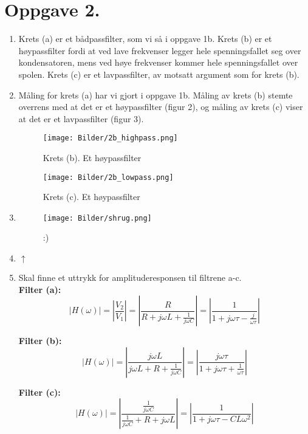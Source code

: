 \documentclass[a4paper,11pt,norsk]{article}
\begin{document}
\section*{Oppgave 2.}
\begin{enumerate}
    \item Krets (a) er et bådpassfilter, som vi så i oppgave 1b. Krets (b) er et høypassfilter fordi at ved lave frekvenser legger hele spenningsfallet seg over kondensatoren,
        mens ved høye frekvenser kommer hele spenningsfallet over spolen. Krets (c) er et lavpassfilter, av motsatt argument som for krets (b).
    \item Måling for krets (a) har vi gjort i oppgave 1b. Måling av krets (b) stemte overrens med at det er et høypassfilter (figur 2), og måling av krets (c) viser at det er et lavpassfilter (figur 3).
        \begin{figure}[H]
            \centering
            \texttt{[image: Bilder/2b\_highpass.png]}
            \caption{Krets (b). Et høypassfilter}
        \end{figure}

        \begin{figure}[H]
            \centering
            \texttt{[image: Bilder/2b\_lowpass.png]}
            \caption{Krets (c). Et høypassfilter}
        \end{figure}
        \newpage
    \item
        \hphantom{Hei}
        \begin{figure}[H]
            \centering
            \texttt{[image: Bilder/shrug.png]}
            \caption{:)}
        \end{figure}
    \item $\uparrow$ 
    \item Skal finne et uttrykk for amplituderesponsen til filtrene a-c. \\
        \textbf{Filter (a):} \\ 
        \[
            \left|H(\omega)\right| = \left|\frac{V_2}{V_1}\right| = \left|\frac{R}{R + j\omega L + \frac{1}{j\omega C}}\right| = \left|\frac{1}{1 + j\omega\tau -\frac{j}{\omega\tau}}\right|
        \]
        
        \textbf{Filter (b):} \\ 
        \[
            \left|H(\omega)\right| = \left|\frac{j\omega L}{j\omega L + R + \frac{1}{j\omega C}}\right| = \left|\frac{j\omega\tau}{1 + j\omega\tau + \frac{1}{\omega\tau}}\right|
        \]

        \textbf{Filter (c):} \\ 
        \[
            \left|H(\omega)\right| = \left|\frac{\frac{1}{j\omega C}}{\frac{1}{j\omega C} + R + j\omega L}\right| = \left|\frac{1}{1 + j\omega\tau - CL\omega^2}\right|
        \]


\end{enumerate}
\end{document}
